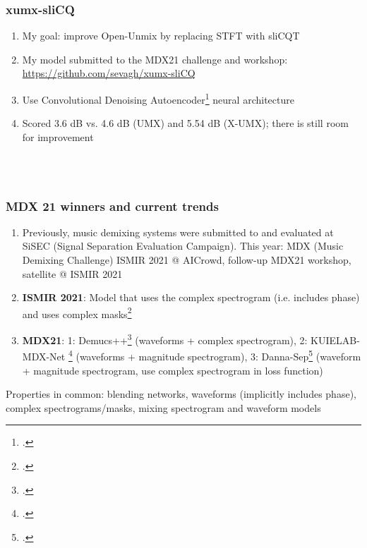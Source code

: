 \documentclass[usenames,dvipsnames]{beamer}
\begin{document}
\begin{frame}
	\frametitle{xumx-sliCQ}
	\begin{enumerate}
		\item
			My goal: improve Open-Unmix by replacing STFT with sliCQT
		\item
			My model submitted to the MDX21 challenge and workshop: \url{https://github.com/sevagh/xumx-sliCQ}
		\item
			Use Convolutional Denoising Autoencoder\footcite{plumbley1, plumbley2} neural architecture
		\item
			Scored 3.6 dB vs. 4.6 dB (UMX) and 5.54 dB (X-UMX); there is still room for improvement
	\end{enumerate}
	\begin{figure}[ht]
		\centering
		\vspace{-1.15em}
		\\
		\vspace{-0.5em}
		\\
		\vspace{-0.5em}
	\end{figure}
\end{frame}

\begin{frame}
	\frametitle{MDX 21 winners and current trends}
	\begin{enumerate}
		\item
			Previously, music demixing systems were submitted to and evaluated at SiSEC (Signal Separation Evaluation Campaign). This year: MDX (Music Demixing Challenge) ISMIR 2021 @ AICrowd, follow-up MDX21 workshop, satellite @ ISMIR 2021
		\item
			\textbf{ISMIR 2021}: Model that uses the complex spectrogram (i.e. includes phase) and uses complex masks\footcite{kong2021decoupling}
		\item
			\textbf{MDX21}: 1: Demucs++\footcite{demucsplus} (waveforms + complex spectrogram), 2: KUIELAB-MDX-Net \footcite{choi2021} (waveforms + magnitude spectrogram), 3: Danna-Sep\footcite{dannasep} (waveform + magnitude spectrogram, use complex spectrogram in loss function)
	\end{enumerate}
	Properties in common: blending networks, waveforms (implicitly includes phase), complex spectrograms/masks, mixing spectrogram and waveform models
\end{frame}
\end{document}
